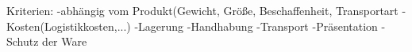         Kriterien:  -abhängig vom Produkt(Gewicht, Größe, Beschaffenheit, Transportart
                    -Kosten(Logistikkosten,...)
                    -Lagerung
                    -Handhabung
                    -Transport
                    -Präsentation
                    -Schutz der Ware












